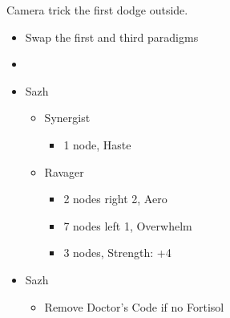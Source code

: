 Camera trick the first dodge outside.
\vfill
	\begin{menu}
		\begin{itemize}
			\paradigm
			\begin{itemize}
				\item Swap the first and third paradigms
				\item {}%
				      {\paradigmline[1]{\textit{\syn}}{\textit{\sab}}{}}%
				      {\paradigmline{\com}{\med}{}}%
				      {\paradigmline{\com}{\rav}{}}%
				      {\paradigmline{\rav}{\rav}{}}%
				      {\paradigmline{[\rav]}{\sab}{}}%
				      {\paradigmline{[\com]}{\sab}{}}
			\end{itemize}
			\crystarium
			\begin{itemize}
				\item Sazh
				      \begin{itemize}
					      \item Synergist
					            \begin{itemize}
						            \item 1 node, Haste
					            \end{itemize}
					      \item Ravager
					            \begin{itemize}
						            \item 2 nodes right 2, Aero
						            \item 7 nodes left 1, Overwhelm
						            \item 3 nodes, Strength: +4
					            \end{itemize}
				      \end{itemize}
			\end{itemize}
			\equip
			\begin{itemize}
				\item Sazh
				      \begin{itemize}
					      \item Remove Doctor's Code if no Fortisol
				      \end{itemize}
			\end{itemize}
		\end{itemize}
	\end{menu}

